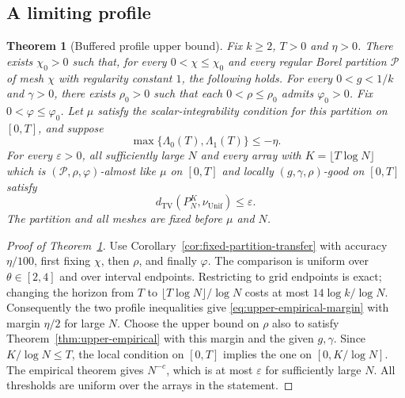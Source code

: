 \documentclass[11pt]{article}
\numberwithin{equation}{section}
\newtheorem{theorem}{Theorem}[section]
\theoremstyle{definition}
\theoremstyle{remark}
\newcommand{\TV}{\mathrm{TV}}
\newcommand{\Unif}{\mathrm{Unif}}
\newcommand{\dTV}{d_{\TV}}
\newcommand{\nuUnif}{\nu_{\Unif}}
\newcommand{\1}{\mathbf 1}
\begin{document}
\subsection{A limiting profile}

\begin{theorem}[Buffered profile upper bound]%
\label{thm:upper-profile}
Fix $k\ge2$, $T>0$ and $\eta>0$. There exists $\chi_0>0$ such that,
for every $0<\chi\le\chi_0$ and every regular Borel partition $\mathcal P$ of
mesh $\chi$ with regularity constant $1$, the following holds.
For every $0<g<1/k$ and $\gamma>0$, there exists $\rho_0>0$ such
that each $0<\rho\le\rho_0$ admits $\varphi_0>0$. Fix
$0<\varphi\le\varphi_0$. Let $\mu$ satisfy the scalar-integrability
condition for this partition on $[0,T]$, and suppose
\[
 \max\{\Lambda_0(T),\Lambda_1(T)\}\le-\eta.
\]
For every $\varepsilon>0$, all sufficiently large $N$ and every array
with $K=\lfloor T\log N\rfloor$ which is
$(\mathcal P,\rho,\varphi)$-almost like $\mu$ on $[0,T]$ and locally
$(g,\gamma,\rho)$-good on $[0,T]$ satisfy
\[
 \dTV(P_N^K,\nuUnif)\le\varepsilon.
\]
The partition and all meshes are fixed before $\mu$ and $N$.
\end{theorem}

\begin{proof}[Proof of Theorem~\ref{thm:upper-profile}]
Use Corollary~\ref{cor:fixed-partition-transfer} with accuracy
$\eta/100$, first fixing $\chi$, then $\rho$, and finally $\varphi$.
The comparison is uniform over $\theta\in[2,4]$ and over interval
endpoints. Restricting to grid endpoints is exact; changing the
horizon from $T$ to $\lfloor T\log N\rfloor/\log N$ costs at most
$14\log k/\log N$. Consequently the two profile inequalities
give \eqref{eq:upper-empirical-margin} with margin $\eta/2$ for large
$N$. Choose the upper bound on $\rho$ also to satisfy
Theorem~\ref{thm:upper-empirical} with this margin and the given
$g,\gamma$. Since $K/\log N\le T$, the local condition on $[0,T]$
implies the one on $[0,K/\log N]$. The empirical theorem gives
$N^{-c}$, which is at most $\varepsilon$ for sufficiently large $N$.
All thresholds are uniform over the arrays in the statement.
\end{proof}
\end{document}
